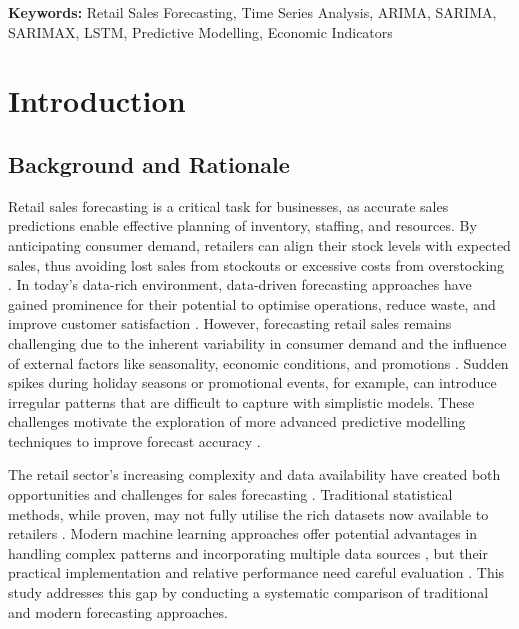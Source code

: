 \documentclass[12pt,a4paper]{report}
\begin{document}
\vspace{0.5cm}
\noindent\textbf{Keywords:} Retail Sales Forecasting, Time Series Analysis, ARIMA, SARIMA, SARIMAX, LSTM, Predictive Modelling, Economic Indicators

\tableofcontents
{}
\clearpage

\listoffigures
{}
\clearpage

\listoftables
{}
\clearpage

\cleardoublepage
{}  %
\setcounter{page}{1}

\chapter{Introduction}

\section{Background and Rationale}


Retail sales forecasting is a critical task for businesses, as accurate sales predictions enable effective planning of inventory, staffing, and resources. By anticipating consumer demand, retailers can align their stock levels with expected sales, thus avoiding lost sales from stockouts or excessive costs from overstocking \citep{choi2018big}. In today's data-rich environment, data-driven forecasting approaches have gained prominence for their potential to optimise operations, reduce waste, and improve customer satisfaction \citep{ajiga2023ai}. However, forecasting retail sales remains challenging due to the inherent variability in consumer demand and the influence of external factors like seasonality, economic conditions, and promotions \citep{hyndman2022large}. Sudden spikes during holiday seasons or promotional events, for example, can introduce irregular patterns that are difficult to capture with simplistic models. These challenges motivate the exploration of more advanced predictive modelling techniques to improve forecast accuracy \citep{petropoulos2022forecasting}.

The retail sector's increasing complexity and data availability have created both opportunities and challenges for sales forecasting \citep{baker2021covid}. Traditional statistical methods, while proven, may not fully utilise the rich datasets now available to retailers \citep{box2015time}. Modern machine learning approaches offer potential advantages in handling complex patterns and incorporating multiple data sources \citep{lim2021temporal}, but their practical implementation and relative performance need careful evaluation \citep{lipton2018mythos}. This study addresses this gap by conducting a systematic comparison of traditional and modern forecasting approaches.
\end{document}
